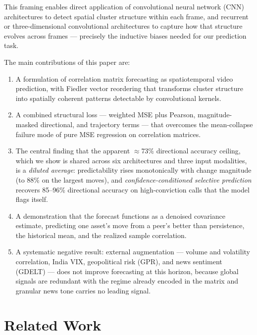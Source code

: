 \documentclass[runningheads]{llncs}
\begin{document}
This framing enables direct application of convolutional neural network
(CNN) architectures to detect spatial cluster structure within each frame,
and recurrent or three-dimensional convolutional architectures to capture
how that structure evolves across frames --- precisely the inductive biases
needed for our prediction task.

The main contributions of this paper are:
\begin{enumerate}
    \item A formulation of correlation matrix forecasting as
          spatiotemporal video prediction, with Fiedler vector reordering
          that transforms cluster structure into spatially coherent
          patterns detectable by convolutional kernels.
    \item A combined structural loss --- weighted MSE plus Pearson,
          magnitude-masked directional, and trajectory terms --- that
          overcomes the mean-collapse failure mode of pure MSE regression
          on correlation matrices.
    \item The central finding that the apparent $\approx$73\% directional
          accuracy ceiling, which we show is shared across six
          architectures and three input modalities, is a \emph{diluted
          average}: predictability rises monotonically with change
          magnitude (to 88\% on the largest moves), and
          \emph{confidence-conditioned selective prediction} recovers
          85--96\% directional accuracy on high-conviction calls that the
          model flags itself.
    \item A demonstration that the forecast functions as a denoised
          covariance estimate, predicting one asset's move from a peer's
          better than persistence, the historical mean, and the realized
          sample correlation.
    \item A systematic negative result: external augmentation --- volume
          and volatility correlation, India VIX, geopolitical risk
          (GPR), and news sentiment (GDELT) --- does not improve
          forecasting at this horizon, because global signals are
          redundant with the regime already encoded in the matrix and
          granular news tone carries no leading signal.
\end{enumerate}

\section{Related Work}\label{sec:related}
\end{document}
